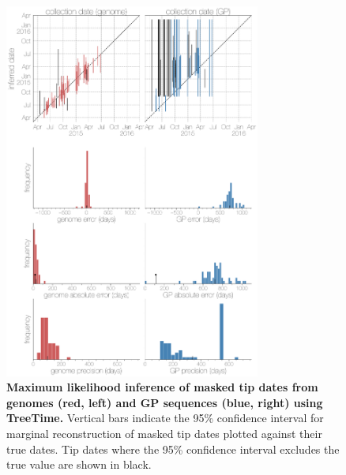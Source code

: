\documentclass[11pt,oneside,letterpaper]{article}
\begin{document}
\begin{figure}[h]
 \centering
	\includegraphics[width=0.75\textwidth]{supp_figures/sfigX_treetimeDates.png}
	\caption{\textbf{Maximum likelihood inference of masked tip dates from genomes (red, left) and GP sequences (blue, right) using TreeTime.}
  Vertical bars indicate the 95\% confidence interval for marginal reconstruction of masked tip dates plotted against their true dates.
  Tip dates where the 95\% confidence interval excludes the true value are shown in black.
	}
	\label{TTdates}
\end{figure}
\end{document}
